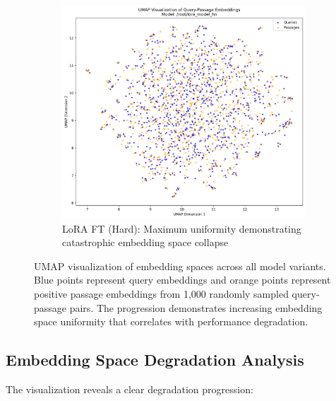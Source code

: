 \begin{figure}[p]
\vspace{0.8cm}

\begin{subfigure}{0.48\textwidth}
\centering
\includegraphics[width=\textwidth, height=0.75\textwidth, keepaspectratio]{umap_visualization__root_lora_model_hn.png}
\caption{LoRA FT (Hard): Maximum uniformity demonstrating catastrophic embedding space collapse}
\label{fig:umap_lora_hard_thesis}
\end{subfigure}

\caption{UMAP visualization of embedding spaces across all model variants. Blue points represent query embeddings and orange points represent positive passage embeddings from 1,000 randomly sampled query-passage pairs. The progression demonstrates increasing embedding space uniformity that correlates with performance degradation.}
\label{fig:umap_all_thesis}
\end{figure}

\subsection{Embedding Space Degradation Analysis}

The visualization reveals a clear degradation progression:

